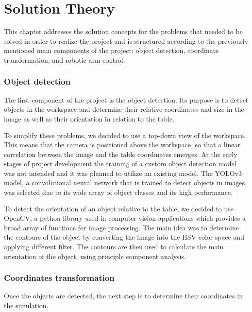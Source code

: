 
\chapter{Solution Theory} %
\label{theory} %


This chapter addresses the solution concepts for the problems that needed to be solved in order to realize the project and is structured according to the previously mentioned main components of the project: object detection, coordinate transformation, and robotic arm control. 
 
\subsection{Object detection}
The first component of the project is the object detection. Its purpose is to detect objects in the workspace and determine their relative coordinates and size in the image as well as their orientation in relation to the table. 

To simplify these problems, we decided to use a top-down view of the workspace. This means that the camera is positioned above the workspace, so that a linear correlation between the image and the table coordinates emerges. At the early stages of project development the training of a custom object detection model was not intended and it was planned to utilize an existing model. The YOLOv3 model, a convolutional neural network that is trained to detect objects in images, was selected due to its wide array of object classes and its high performance.

To detect the orientation of an object relative to the table, we decided to use OpenCV, a python library used in computer vision applications which provides a broad array of functions for image processing. The main idea was to determine the contours of the object by converting the image into the HSV color space and applying different filter. The contours are then used to calculate the main orientation of the object, using principle component analysis. 

\subsection{Coordinates transformation}

Once the objects are detected, the next step is to determine their coordinates in the simulation. 

